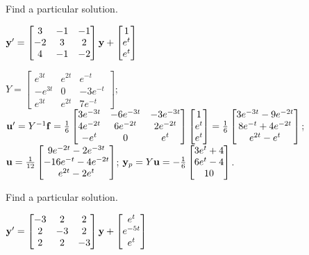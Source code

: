 \documentclass{ximera}
\begin{document}
 \begin{problem}\label{exer:10.7.8}
 Find a particular solution.
 
 $ {\bf
y}'=\begin{bmatrix}3&-1&-1\\-2&3&2\\4&-1&-2\end{bmatrix}{\bf
y}+\begin{bmatrix}1\\e^t\\e^t\end{bmatrix}$

\begin{solution}
    $Y=\begin{bmatrix}
e^{3t}&e^{2t}&e^{-t}\\-e^{3t}&0&-3e^{-t}\\e^{3t}&e^{2t}&7
e^{-t}\end{bmatrix}$;
${\bf u}'=Y^{-1}{\bf f}=
\frac{1}{6}\begin{bmatrix}
3e^{-3t}&-6e^{-3t}&-3e^{-3t}\\4e^{-2t}&6e^{-2t}&2e^{-2t}\\
-e^t&0&e^t\end{bmatrix}
\begin{bmatrix}1\\e^t\\e^t\end{bmatrix}=
\frac{1}{6}\begin{bmatrix}
3e^{-3t}-9e^{-2t}\\8e^{-t}+4e^{-2t}\\e^{2t}-e^t\end{bmatrix}$;
${\bf u}=
\frac{1}{12}\begin{bmatrix}9e^{-2t}-2e^{-3t}\\
-16e^{-t}-4e^{-2t}\\e^{2t}-2e^t\end{bmatrix}$;
${\bf y}_p=Y{\bf u}=
-\frac{1}{6}\begin{bmatrix}3e^t+4\\6e^t-4\\10
\end{bmatrix}$.
\end{solution}
\end{problem}
 

 \begin{problem}\label{exer:10.7.9}
 Find a particular solution.

$ {\bf y}'=\begin{bmatrix}-3&2&2\\2&-3&2\\2&2&-3\end{bmatrix}{\bf
y}+\begin{bmatrix}e^t\\e^{-5t}\\e^t\end{bmatrix}$
\end{problem}
\end{document}
